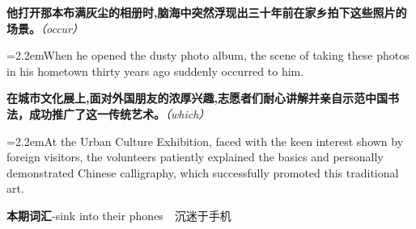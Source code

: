 \documentclass[11pt,a4paper]{article}
\newcommand{\num}[1]{\makebox[1.9em][r]{#1.}\hspace{0.3em}}
\newcommand{\prompt}[1]{\emph{\textcolor{tipblue}{\small（#1）}}}
\begin{document}
\begin{minipage}{\linewidth}

\num{24}\textbf{他打开那本布满灰尘的相册时,脑海中突然浮现出三十年前在家乡拍下这些照片的场景。}\prompt{occur}

\vspace{0.15em}

\noindent\hangindent=2.2em\hspace{2.2em}When he opened the dusty photo album, the scene of taking these photos in his hometown thirty years ago suddenly occurred to him.

\end{minipage}

\begin{minipage}{\linewidth}

\num{25}\textbf{在城市文化展上,面对外国朋友的浓厚兴趣,志愿者们耐心讲解并亲自示范中国书法，成功推广了这一传统艺术。}\prompt{which}

\vspace{0.15em}

\noindent\hangindent=2.2em\hspace{2.2em}At the Urban Culture Exhibition, faced with the keen interest shown by foreign visitors, the volunteers patiently explained the basics and personally demonstrated Chinese calligraphy, which successfully promoted this traditional art.

\end{minipage}

\num{26}\textbf{本期词汇}\quad -sink into their phones　沉迷于手机
\end{document}
